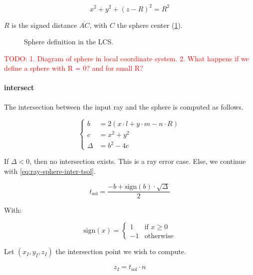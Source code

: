 \begin{equation} \label{eq:sphere-def}
x^2 + y^2 + (z - R)^2 = R^2
\end{equation}

$R$ is the signed distance $\overline{AC}$, with $C$ the sphere center
(\cref{fig:sphere-def-lcs}).

\begin{figure} \caption{\label{fig:sphere-def-lcs} Sphere definition
in the LCS.}

\end{figure}

\textcolor{red}{TODO:
1. Diagram of sphere in local coordinate system.
2. What happens if we define a sphere with R = 0? and for small R?
}

\paragraph{intersect}
The intersection between the input ray and the sphere is computed as
follows.

\begin{equation} \label{eq:ray-sphere-inter1}
\begin{cases}
b &= 2 (x \cdot l + y \cdot m - n \cdot R) \\
c &= x^2 + y^2 \\
\Delta &= b^2 - 4 c
\end{cases}
\end{equation}

If $\Delta < 0$, then no intersection exists. This is a ray error case. Else,
we continue with \cref{eq:ray-sphere-inter-tsol}.

\begin{equation} \label{eq:ray-sphere-inter-tsol}
t_\textrm{sol} = \frac{-b + \textrm{sign}(b) \cdot \sqrt{\Delta}}{2}
\end{equation}

With:

\begin{equation}
\textrm{sign}(x) = \begin{cases}
1 & \text{if } x \geq 0 \\
-1 & \text{otherwise}
\end{cases}
\end{equation}

Let $(x_I, y_I, z_I)$ the intersection point we wish to compute.

\begin{equation}
z_I = t_\textrm{sol} \cdot n
\end{equation}

